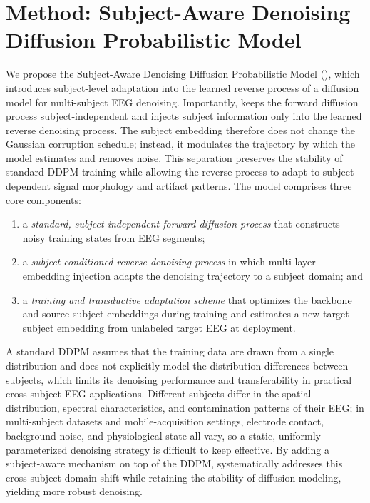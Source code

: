 \section{Method: Subject-Aware Denoising Diffusion Probabilistic Model}
\label{sec:method}

We propose the Subject-Aware Denoising Diffusion Probabilistic Model (\saddpm{}), which introduces subject-level adaptation into the learned reverse
process of a diffusion model for multi-subject EEG denoising. Importantly, \saddpm{} keeps the forward diffusion process subject-independent and injects
subject information only into the learned reverse denoising process. The subject embedding therefore does not change the Gaussian corruption schedule; instead, it modulates the trajectory by which the model estimates and removes noise. This separation preserves the stability of standard DDPM training while allowing the reverse process to adapt to subject-dependent signal morphology and artifact patterns. The model comprises three core components:

\begin{enumerate}
  \item a \emph{standard, subject-independent forward diffusion process} that constructs noisy training states from EEG segments;
  \item a \emph{subject-conditioned reverse denoising process} in which multi-layer embedding injection adapts the denoising trajectory to a subject domain; and
  \item a \emph{training and transductive adaptation scheme} that optimizes the backbone and source-subject embeddings during training and estimates a new target-subject embedding from unlabeled target EEG at deployment.
\end{enumerate}

A standard DDPM assumes that the training data are drawn from a single distribution and does not explicitly model the distribution differences between subjects, which limits its denoising performance and transferability in practical cross-subject EEG applications. Different subjects differ in the spatial distribution, spectral characteristics, and contamination patterns of
their EEG; in multi-subject datasets and mobile-acquisition settings, electrode contact, background noise, and physiological state all vary, so a static, uniformly parameterized denoising strategy is difficult to keep effective. By adding a subject-aware mechanism on top of the DDPM, \saddpm{} systematically addresses this cross-subject domain shift while retaining the stability of diffusion modeling, yielding more robust denoising.

